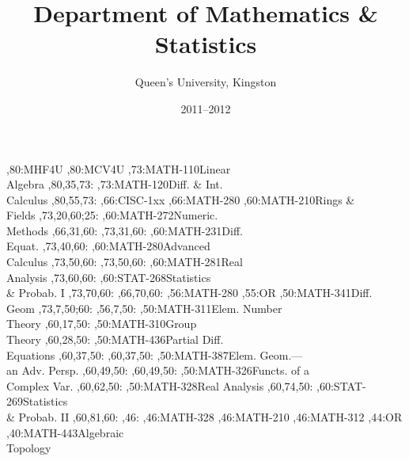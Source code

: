\documentclass[9pt]{extarticle}
\begin{document}
\title{Department of Mathematics \& Statistics}
\author{Queen's University, Kingston}
\date{2011--2012}
\maketitle
\thispagestyle{empty}
\begin{chart}
\grid
{},80:{MHF4U}
,80:{MCV4U}
,73:{MATH-110}{Linear\\Algebra}{}
  ,80,35,73:
,73:{MATH-120}{Diff. \& Int.\\Calculus}{}
  ,80,55,73:
,66:{CISC-1xx}
,66:{MATH-280}
,60:{MATH-210}{Rings \&\\Fields}{}
  ,73,20,60;25:
,60:{MATH-272}{Numeric.\\Methods}{}
  ,66,31,60:
  ,73,31,60:
,60:{MATH-231}{Diff.\\Equat.}{}
  ,73,40,60:
,60:{MATH-280}{Advanced\\Calculus}{}
  ,73,50,60:
  ,73,50,60:
,60:{MATH-281}{Real\\Analysis}{}
  ,73,60,60:
,60:{STAT-268}{Statistics\\\& Probab. I}{}
  ,73,70,60:
  ,66,70,60:
,56:{MATH-280}
,55:{OR}
,50:{MATH-341}{Diff.\\Geom}{}
  ,73,7,50;60:
  ,56,7,50:
,50:{MATH-311}{Elem. Number\\Theory}{}
  ,60,17,50:
,50:{MATH-310}{Group\\Theory}{}
  ,60,28,50:
,50:{MATH-436}{Partial Diff.\\Equations}{}
  ,60,37,50:
  ,60,37,50:
,50:{MATH-387}{Elem. Geom.---\\an Adv. Persp.}{}
  ,60,49,50:
  ,60,49,50:
,50:{MATH-326}{Functs. of a\\Complex Var.}{}
  ,60,62,50:
,50:{MATH-328}{Real Analysis}{}
  ,60,74,50:
,60:{STAT-269}{Statistics\\\& Probab. II}{}
  ,60,81,60:
,46:{}
,46:{MATH-328}
,46:{MATH-210}
,46:{MATH-312}
,44:{OR}
,40:{MATH-443}{Algebraic\\Topology}{}

\end{chart}
\end{document}
